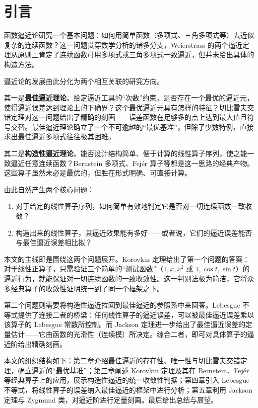 \section{引言}

函数逼近论研究一个基本问题：如何用简单函数（多项式、三角多项式等）去近似复杂的连续函数？这一问题贯穿数学分析的诸多分支，Weierstrass 的两个逼近定理从原则上肯定了连续函数可用多项式或三角多项式一致逼近，但并未给出具体的构造方法。

逼近论的发展由此分化为两个相互关联的研究方向。

其一是\textbf{最佳逼近理论}。给定逼近工具的“次数”约束，是否存在一个最优的逼近元，使得逼近误差达到理论上的下确界？这个最优逼近元具有怎样的特征？切比雪夫交错定理对这一问题给出了精确的刻画——误差函数在足够多的点上达到最大值且符号交替。最佳逼近理论确立了一个不可逾越的“最优基准”，但除了少数特例，直接求出最佳逼近多项式往往极其困难。

其二是\textbf{构造性逼近理论}。能否设计结构简单、便于计算的线性算子序列，使之能一致逼近任意连续函数？Bernstein 多项式、Fejér 算子等都是这一思路的经典产物。这些算子虽然未必是最优的，但胜在形式明确、可直接计算。

由此自然产生两个核心问题：
\begin{enumerate}
    \item 对于给定的线性算子序列，如何简单有效地判定它是否对一切连续函数一致收敛？
    \item 构造出来的线性算子，其逼近效果能有多好——或者说，它们的逼近误差能否与最佳逼近误差相比拟？
\end{enumerate}

本文的主线即是围绕这两个问题展开。Korovkin 定理给出了第一个问题的答案：对于线性正算子，只需验证三个简单的“测试函数”（$1, x, x^2$ 或 $1, \cos t, \sin t$）的逼近行为，就能保证对一切连续函数的一致收敛性。这一判别法极为简洁，它将众多经典算子的收敛性证明统一到了同一个框架之下。

第二个问题则需要将构造性逼近拉回到最佳逼近的参照系中来回答。Lebesgue 不等式提供了连接二者的桥梁：任何线性算子的逼近误差，可以被最佳逼近误差乘以该算子的 Lebesgue 常数所控制。而 Jackson 定理进一步给出了最佳逼近误差的定量估计——它由函数的光滑性（连续模）所决定。综合二者，即可对具体算子的逼近阶给出精确刻画。

本文的组织结构如下：第二章介绍最佳逼近的存在性、唯一性与切比雪夫交错定理，确立逼近的“最优基准”；第三章阐述 Korovkin 定理及其在 Bernstein、Fejér 等经典算子上的应用，展示构造性逼近的统一收敛性判据；第四章引入 Lebesgue 不等式，将线性算子的误差纳入最佳逼近的框架中进行分析；第五章利用 Jackson 定理与 Zygmund 类，对逼近阶进行定量刻画。最后给出总结与展望。